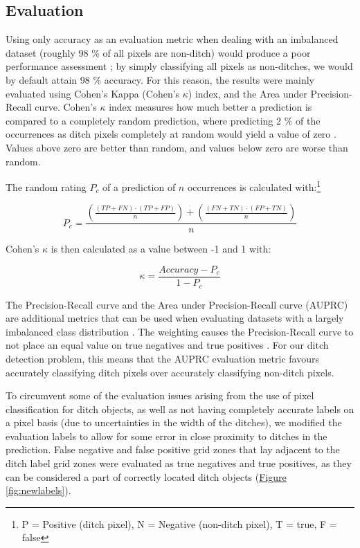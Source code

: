 \documentclass[11pt, review]{elsarticle} %
\begin{document}
\subsection{Evaluation} \label{evaluation}

Using only accuracy as an evaluation metric when dealing with an imbalanced dataset (roughly 98 \% of all pixels are non-ditch) would produce a poor performance assessment \citep{balanced}; by simply classifying all pixels as non-ditches, we would by default attain 98 \% accuracy. For this reason, the results were mainly evaluated using Cohen's Kappa (Cohen's $\kappa$) index, and the Area under Precision-Recall curve. Cohen's $\kappa$ index measures how much better a prediction is compared to a completely random prediction, where predicting 2 \% of the occurrences as ditch pixels completely at random would yield a value of zero \citep{kappa123}. Values above zero are better than random, and values below zero are worse than random.

The random rating $P_c$ of a prediction of $n$ occurrences is calculated with:\footnote{ P = Positive (ditch pixel), N = Negative (non-ditch pixel), T = true, F = false}

$$
P_c = \frac{\left(\frac{(TP + FN) \cdot (TP + FP)}{n}\right) + \left(\frac{(FN + TN) \cdot (FP + TN)}{n}\right)}{n}
$$


Cohen's $\kappa$ is then calculated as a value between -1 and 1 with:

$$\kappa = \frac{Accuracy - P_c}{1 - P_c}$$

The Precision-Recall curve and the Area under Precision-Recall curve (AUPRC) are additional metrics that can be used when evaluating datasets with a largely imbalanced class distribution \citep{precision_recall_curve}. The weighting causes the Precision-Recall curve to not place an equal value on true negatives and true positives \citep{precision_recall_curve}. For our ditch detection problem, this means that the AUPRC evaluation metric favours accurately classifying ditch pixels over accurately classifying non-ditch pixels.

To circumvent some of the evaluation issues arising from the use of pixel classification for ditch objects, as well as not having completely accurate labels on a pixel basis (due to uncertainties in the width of the ditches), we modified the evaluation labels to allow for some error in close proximity to ditches in the prediction. False negative and false positive grid zones that lay adjacent to the ditch label grid zones were evaluated as true negatives and true positives, as they can be considered a part of correctly located ditch objects (\hyperref[fig:newlabels]{Figure} \ref{fig:newlabels}).
\end{document}
